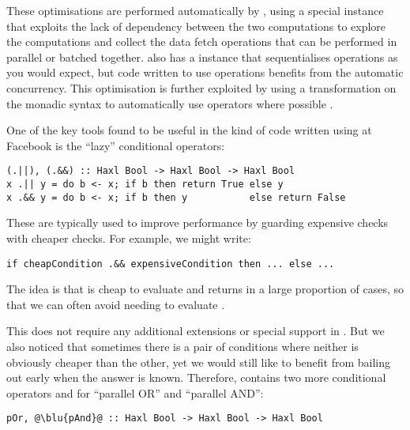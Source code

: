 These optimisations are performed automatically by \Haxl, using a
special  instance that exploits the lack of
dependency between the two computations to explore the computations
and collect the data fetch operations that can be performed in
parallel or batched together. \Haxl also has a  instance
that sequentialises operations as you would expect, but code written
to use  operations benefits from the automatic
concurrency. This optimisation is further exploited by using a
transformation on the monadic  syntax to automatically use
 operators where possible \cite{marlow2016applicativedo}.

One of the key tools found to be useful in the kind of code written
using \Haxl at Facebook is the ``lazy'' conditional operators:

\vspace{1mm}
\begin{verbatim}
(.||), (.&&) :: Haxl Bool -> Haxl Bool -> Haxl Bool
x .|| y = do b <- x; if b then return True else y
x .&& y = do b <- x; if b then y           else return False
\end{verbatim}
\vspace{1mm}

These are typically used to improve performance by guarding expensive
checks with cheaper checks.  For example, we might write:

\vspace{1mm}
\begin{verbatim}
if cheapCondition .&& expensiveCondition then ... else ...
\end{verbatim}
\vspace{1mm}

\noindent
The idea is that  is cheap to evaluate and
returns  in a large proportion of cases, so that we can
often avoid needing to evaluate .

This does not require any additional extensions or special support in
\Haxl. But we also noticed that sometimes there is a pair of conditions
where neither is obviously cheaper than the other, yet we would still
like to benefit from bailing out early when the answer is known.
Therefore, \Haxl contains two more conditional operators  and
 for ``parallel OR'' and ``parallel AND'':

\vspace{1mm}
\begin{verbatim}
pOr, @\blu{pAnd}@ :: Haxl Bool -> Haxl Bool -> Haxl Bool
\end{verbatim}
\vspace{1mm}

